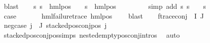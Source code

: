\begin{isabellebody}
\ blast\isanewline
\ \ \isamarkupfalse%
\ {\isachardoublequoteopen}{\isacharparenleft}{\kern0pt}{\isasymforall}s{\isachardot}{\kern0pt}\ {\isacharparenleft}{\kern0pt}s\ {\isasymTurnstile}\ hml{\isacharunderscore}{\kern0pt}pos\ {\isasymalpha}\ {\isasymphi}{\isacharparenright}{\kern0pt}\ {\isacharequal}{\kern0pt}\ {\isacharparenleft}{\kern0pt}s\ {\isasymTurnstile}\ {\isacharparenleft}{\kern0pt}hml{\isacharunderscore}{\kern0pt}pos\ {\isasymalpha}\ {\isasympsi}{\isacharparenright}{\kern0pt}{\isacharparenright}{\kern0pt}{\isacharparenright}{\kern0pt}{\isachardoublequoteclose}\ \isanewline
\ \ \ \ \isamarkupfalse%
\ {\isacharparenleft}{\kern0pt}simp\ add{\isacharcolon}{\kern0pt}\ {\isacartoucheopen}{\isasymforall}s{\isachardot}{\kern0pt}\ {\isacharparenleft}{\kern0pt}s\ {\isasymTurnstile}\ {\isasymphi}{\isacharparenright}{\kern0pt}\ {\isacharequal}{\kern0pt}\ {\isacharparenleft}{\kern0pt}s\ {\isasymTurnstile}\ {\isasympsi}{\isacharparenright}{\kern0pt}{\isacartoucheclose}{\isacharparenright}{\kern0pt}\isanewline
\ \ \isamarkupfalse%
\ \isamarkupfalse%
\ {\isacharquery}{\kern0pt}case\ \isanewline
\ \ \ \ \isamarkupfalse%
\ {\isacartoucheopen}hml{\isacharunderscore}{\kern0pt}failure{\isacharunderscore}{\kern0pt}trace\ {\isacharparenleft}{\kern0pt}hml{\isacharunderscore}{\kern0pt}pos\ {\isasymalpha}\ {\isasympsi}{\isacharparenright}{\kern0pt}{\isacartoucheclose}\ \isamarkupfalse%
\ blast\isanewline
{}\isamarkupfalse%
\isanewline
\ \ \isamarkupfalse%
\ {\isacharparenleft}{\kern0pt}f{\isacharunderscore}{\kern0pt}trace{\isacharunderscore}{\kern0pt}conj\ {\isasymPhi}\ I\ J{\isacharparenright}{\kern0pt}\isanewline
\ \ \isamarkupfalse%
\ neg{\isacharunderscore}{\kern0pt}case{\isacharcolon}{\kern0pt}\ {\isachardoublequoteopen}{\isasymforall}j{\isasymin}{\isasymPhi}\ {\isacharbackquote}{\kern0pt}\ J{\isachardot}{\kern0pt}\ stacked{\isacharunderscore}{\kern0pt}pos{\isacharunderscore}{\kern0pt}conj{\isacharunderscore}{\kern0pt}pos\ j{\isachardoublequoteclose}\ \isanewline
\ \ \ \ \isamarkupfalse%
\ stacked{\isacharunderscore}{\kern0pt}pos{\isacharunderscore}{\kern0pt}conj{\isacharunderscore}{\kern0pt}pos{\isachardot}{\kern0pt}simps\ nested{\isacharunderscore}{\kern0pt}empty{\isacharunderscore}{\kern0pt}pos{\isacharunderscore}{\kern0pt}conj{\isachardot}{\kern0pt}intros{\isacharparenleft}{\kern0pt}{}{\isacharparenright}{\kern0pt}\ \isamarkupfalse%
\ auto\isanewline
\ \ \isamarkupfalse%

\end{isabellebody}
